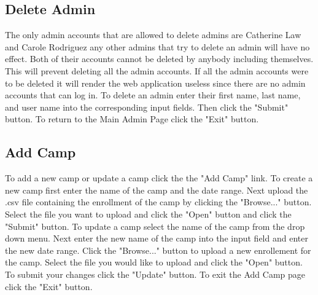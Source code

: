 \documentclass[letterpaper,10pt,serif, draftclsnofoot,onecolumn, compsoc, titlepage]{IEEEtran}
\begin{document}
\subsection{Delete Admin}
The only admin accounts that are allowed to delete admins are Catherine Law and Carole Rodriguez any other admins that try to delete an admin will have no effect. Both of their accounts cannot be deleted by anybody including themselves. This will prevent deleting all the admin accounts. If all the admin accounts were to be deleted it will render the web application useless since there are no admin accounts that can log in. To delete an admin enter their first name, last name, and user name into the corresponding input fields. Then click the "Submit" button. To return to the Main Admin Page click the "Exit" button. 
\subsection{Add Camp}
To add a new camp or update a camp click the the "Add Camp" link. To create a new camp first enter the name of the camp and the date range. Next upload the .csv file containing the enrollment of the camp  by clicking the "Browse..." button. Select the file you want to upload and click the "Open" button and click the "Submit" button. To update a camp select the name of the camp from the drop down menu. Next enter the new name of the camp into the input field and enter the new date range. Click the "Browse..." button to upload a new enrollement for the camp. Select the file you would like to upload and click the "Open" button. To submit your changes click the "Update" button. To exit the Add Camp page click the "Exit" button. 
\end{document}
